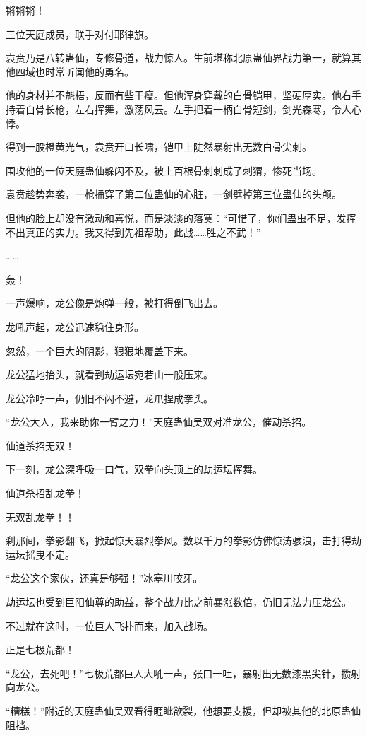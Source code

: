 \begin{this_body}
锵锵锵！

三位天庭成员，联手对付耶律旗。

袁贲乃是八转蛊仙，专修骨道，战力惊人。生前堪称北原蛊仙界战力第一，就算其他四域也时常听闻他的勇名。

他的身材并不魁梧，反而有些干瘦。但他浑身穿戴的白骨铠甲，坚硬厚实。他右手持着白骨长枪，左右挥舞，激荡风云。左手把着一柄白骨短剑，剑光森寒，令人心悸。

得到一股橙黄光气，袁贲开口长啸，铠甲上陡然暴射出无数白骨尖刺。

围攻他的一位天庭蛊仙躲闪不及，被上百根骨刺刺成了刺猬，惨死当场。

袁贲趁势奔袭，一枪捅穿了第二位蛊仙的心脏，一剑劈掉第三位蛊仙的头颅。

但他的脸上却没有激动和喜悦，而是淡淡的落寞：“可惜了，你们蛊虫不足，发挥不出真正的实力。我又得到先祖帮助，此战……胜之不武！”

……

轰！

一声爆响，龙公像是炮弹一般，被打得倒飞出去。

龙吼声起，龙公迅速稳住身形。

忽然，一个巨大的阴影，狠狠地覆盖下来。

龙公猛地抬头，就看到劫运坛宛若山一般压来。

龙公冷哼一声，仍旧不闪不避，龙爪捏成拳头。

“龙公大人，我来助你一臂之力！”天庭蛊仙吴双对准龙公，催动杀招。

仙道杀招无双！

下一刻，龙公深呼吸一口气，双拳向头顶上的劫运坛挥舞。

仙道杀招乱龙拳！

无双乱龙拳！！

刹那间，拳影翻飞，掀起惊天暴烈拳风。数以千万的拳影仿佛惊涛骇浪，击打得劫运坛摇曳不定。

“龙公这个家伙，还真是够强！”冰塞川咬牙。

劫运坛也受到巨阳仙尊的助益，整个战力比之前暴涨数倍，仍旧无法力压龙公。

不过就在这时，一位巨人飞扑而来，加入战场。

正是七极荒都！

“龙公，去死吧！”七极荒都巨人大吼一声，张口一吐，暴射出无数漆黑尖针，攒射向龙公。

“糟糕！”附近的天庭蛊仙吴双看得睚眦欲裂，他想要支援，但却被其他的北原蛊仙阻挡。


\end{this_body}
